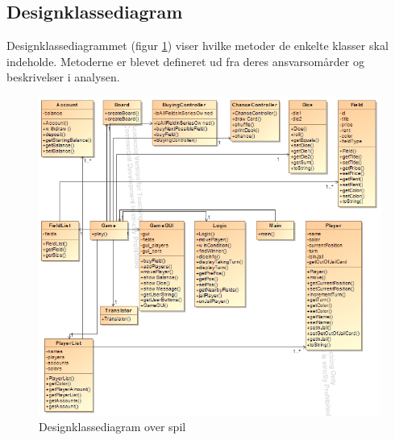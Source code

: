\subsection{Designklassediagram}

Designklassediagrammet (figur \ref{fig:designklassediagram}) viser hvilke metoder de enkelte klasser skal indeholde. Metoderne er blevet defineret ud fra deres ansvarsomårder og beskrivelser i analysen. 

\begin{figure}[H]
    \centering
    \includegraphics[width=17cm]{sources/6_design/designklassediagram.PNG}
    \caption{Designklassediagram over spil}
    \label{fig:designklassediagram}
\end{figure}